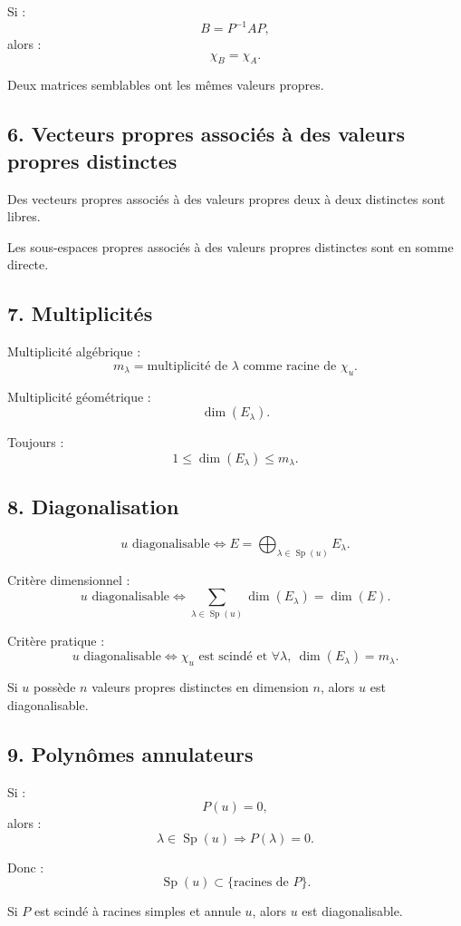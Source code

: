 \documentclass[11pt,a4paper]{article}
\newcommand{\Sp}{\operatorname{Sp}}
\begin{document}
Si :
\[
B=P^{-1}AP,
\]
alors :
\[
\chi_B=\chi_A.
\]

Deux matrices semblables ont les mêmes valeurs propres.

\subsection*{6. Vecteurs propres associés à des valeurs propres distinctes}

Des vecteurs propres associés à des valeurs propres deux à deux distinctes sont libres.

Les sous-espaces propres associés à des valeurs propres distinctes sont en somme directe.

\subsection*{7. Multiplicités}

Multiplicité algébrique :
\[
m_\lambda=\text{multiplicité de }\lambda\text{ comme racine de }\chi_u.
\]

Multiplicité géométrique :
\[
\dim(E_\lambda).
\]

Toujours :
\[
1\leq\dim(E_\lambda)\leq m_\lambda.
\]

\subsection*{8. Diagonalisation}

\[
u\text{ diagonalisable}
\Longleftrightarrow
E=\bigoplus_{\lambda\in\Sp(u)}E_\lambda.
\]

Critère dimensionnel :
\[
u\text{ diagonalisable}
\Longleftrightarrow
\sum_{\lambda\in\Sp(u)}\dim(E_\lambda)=\dim(E).
\]

Critère pratique :
\[
u\text{ diagonalisable}
\Longleftrightarrow
\chi_u\text{ est scindé et }\forall\lambda,\ \dim(E_\lambda)=m_\lambda.
\]

Si \(u\) possède \(n\) valeurs propres distinctes en dimension \(n\), alors \(u\) est diagonalisable.

\subsection*{9. Polynômes annulateurs}

Si :
\[
P(u)=0,
\]
alors :
\[
\lambda\in\Sp(u)\Longrightarrow P(\lambda)=0.
\]

Donc :
\[
\Sp(u)\subset\{\text{racines de }P\}.
\]

Si \(P\) est scindé à racines simples et annule \(u\), alors \(u\) est diagonalisable.
\end{document}

